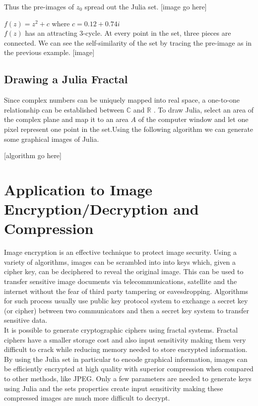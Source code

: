 \documentclass[12pt]{article}
\begin{document}
{\begin{exmp}
Thus the pre-images of $z_0$ spread out the Julia set.  
[image go here]
\end{exmp}


\begin{exmp}
$f(z) = z^{2}+c$ where  $c=0.12 + 0.74i$ \cite{yang} \\
$f(z)$ has an attracting 3-cycle. At every point in the set, three pieces are connected. 
We can see the self-similarity of the set by tracing the pre-image as in the previous example.
[image]
\end{exmp}



\subsection{Drawing a Julia Fractal}
Since complex numbers can be uniquely mapped into real space,  a one-to-one relationship can be established between $\mathbb{C}$ and $\mathbb{R}$  \cite{china}. To draw Julia, select an area of the complex plane and map it to an area $A$ of the computer window and let one pixel represent one point in the set\cite{china}.Using the following algorithm we can generate some graphical images of Julia.

[algorithm go here]


}


\section{Application to Image  Encryption/Decryption and Compression}
{\parindent0pt
Image encryption is an effective technique to protect image security. Using a variety of algorithms, images can be scrambled into into keys which, given a cipher key, can be deciphered to reveal the original image. This can be used to transfer sensitive image documents via telecommunications, satellite and the internet without the fear of third party tampering or eavesdropping. Algorithms for such process usually use public key protocol system  to exchange a secret key (or cipher) between two communicators and then a secret key system to transfer sensitive data. \cite{moham} \\

It is possible to generate cryptographic ciphers using fractal systems. Fractal ciphers have a smaller storage cost and also input sensitivity \cite{china} making them very difficult to crack while reducing memory needed to store encrypted information. By using the Julia set in particular to encode graphical information,  images can be efficiently encrypted at high quality with superior compression when compared to other methods, like JPEG.\cite{cotty} Only a few parameters are needed to generate keys  using Julia \cite{algo} and the sets properties create input sensitivity making these compressed images are much more difficult to decrypt. \cite{china}
}
\end{document}
